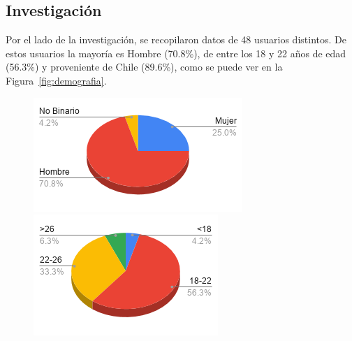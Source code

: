 \subsection{Investigación}
Por el lado de la investigación, se recopilaron datos de 48 usuarios distintos. De estos usuarios la mayoría es Hombre (70.8\%), de entre los 18 y 22 años de edad (56.3\%) y proveniente de Chile (89.6\%), como se puede ver en la Figura~\ref{fig:demografia}.



\begin{figure}[h]
    \centering
    \begin{minipage}{.5\textwidth}
        \includegraphics[width=\textwidth]{imgs/chart-genero.png}
    \end{minipage}
    \begin{minipage}{.42\textwidth}
        \includegraphics[width=\textwidth]{imgs/chart-edad.png}

\end{minipage}
\end{figure}
